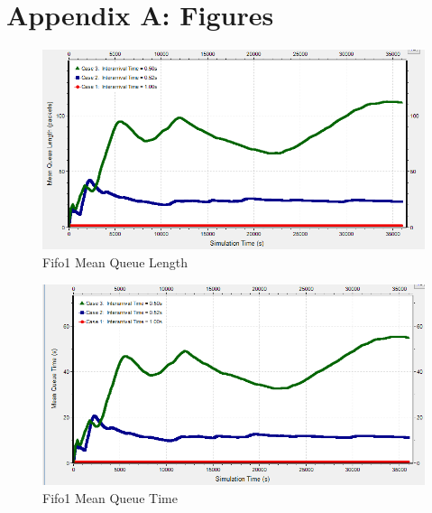 \documentclass{article}
\begin{document}
\newpage
\section*{Appendix A:  Figures}

\begin{figure}[h!]
	\begin{center}
	\includegraphics[scale=0.75]{Images/Fifo1_QueueLength.PNG}
	\vspace{-.25cm}
	\caption{Fifo1 Mean Queue Length}
	\label{fifo1_qlen}
	\end{center}
\end{figure}

\begin{figure}[h!]
	\begin{center}
	\includegraphics[scale=0.75]{Images/Fifo1_QueueTime.PNG}
	\vspace{-.25cm}
	\caption{Fifo1 Mean Queue Time}
	\label{fifo1_qtime}
	\end{center}
\end{figure}
\end{document}
